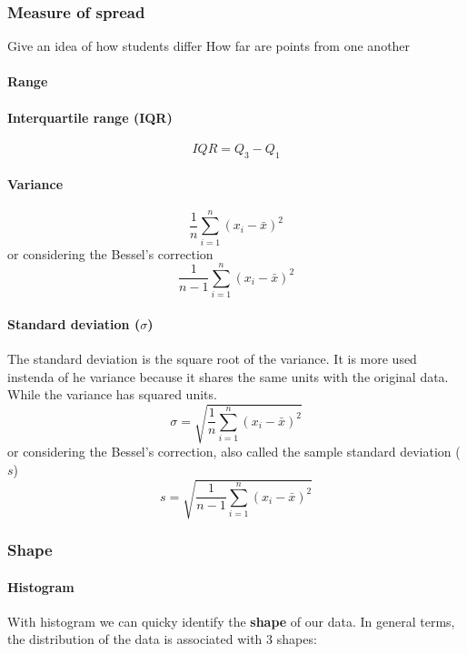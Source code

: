 \documentclass[]{article}
\begin{document}
\subsubsection{Measure of spread}Give an idea of how students differ
How far are points from one another

\paragraph{Range}
\paragraph{Interquartile range (IQR)}
\[ IQR = Q_{3} - Q_{1}\]
\paragraph{Variance} 
\[ \frac{1}{n}\sum_{i=1}^{n}(x_{i} - \bar{x})^2 \]
or considering the Bessel's correction
\[ \frac{1}{n-1}\sum_{i=1}^{n}(x_{i} - \bar{x})^2 \]



\paragraph{Standard deviation ($ \sigma $)}
The standard deviation is the square root of the variance. It is more used instenda of he variance because it shares the same units with the original data. While the variance has squared units. 
\[ \sigma = \sqrt{\frac{1}{n}\sum_{i=1}^{n}(x_{i} - \bar{x})^2} \]
or considering the Bessel's correction, also called the sample standard deviation ($ s $)
\[ s = \sqrt{\frac{1}{n-1}\sum_{i=1}^{n}(x_{i} - \bar{x})^2} \]

\subsubsection{Shape}

\paragraph{Histogram}
With histogram we can quicky identify the \textbf{shape} of our data. In general terms, the distribution of the data is associated with 3 shapes:
\end{document}
